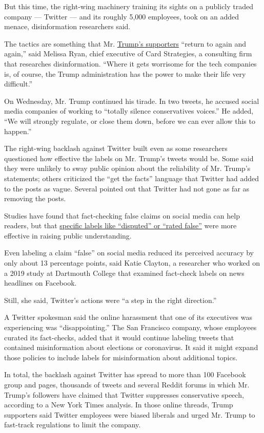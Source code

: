 But this time, the right-wing machinery training its sights on a
publicly traded company --- Twitter --- and its roughly 5,000 employees,
took on an added menace, disinformation researchers said.

The tactics are something that Mr.
\href{https://www.nytimes.com/2020/06/21/us/politics/trump-rally-supporters.html}{Trump's
supporters} ``return to again and again,'' said Melissa Ryan, chief
executive of Card Strategies, a consulting firm that researches
disinformation. ``Where it gets worrisome for the tech companies is, of
course, the Trump administration has the power to make their life very
difficult.''

On Wednesday, Mr. Trump continued his tirade. In two tweets, he accused
social media companies of working to ``totally silence conservatives
voices.'' He added, ``We will strongly regulate, or close them down,
before we can ever allow this to happen.''

The right-wing backlash against Twitter built even as some researchers
questioned how effective the labels on Mr. Trump's tweets would be. Some
said they were unlikely to sway public opinion about the reliability of
Mr. Trump's statements; others criticized the ``get the facts'' language
that Twitter had added to the posts as vague. Several pointed out that
Twitter had not gone as far as removing the posts.

Studies have found that fact-checking false claims on social media can
help readers, but that
\href{https://www.dartmouth.edu/~nyhan/fake-news-solutions.pdf}{specific
labels like ``disputed'' or ``rated false''} were more effective in
raising public understanding.

Even labeling a claim ``false'' on social media reduced its perceived
accuracy by only about 13 percentage points, said Katie Clayton, a
researcher who worked on a 2019 study at Dartmouth College that examined
fact-check labels on news headlines on Facebook.

Still, she said, Twitter's actions were ``a step in the right
direction.''

A Twitter spokesman said the online harassment that one of its
executives was experiencing was ``disappointing.'' The San Francisco
company, whose employees curated its fact-checks, added that it would
continue labeling tweets that contained misinformation about elections
or coronavirus. It said it might expand those policies to include labels
for misinformation about additional topics.

In total, the backlash against Twitter has spread to more than 100
Facebook group and pages, thousands of tweets and several Reddit forums
in which Mr. Trump's followers have claimed that Twitter suppresses
conservative speech, according to a New York Times analysis. In those
online threads, Trump supporters said Twitter employees were biased
liberals and urged Mr. Trump to fast-track regulations to limit the
company.

